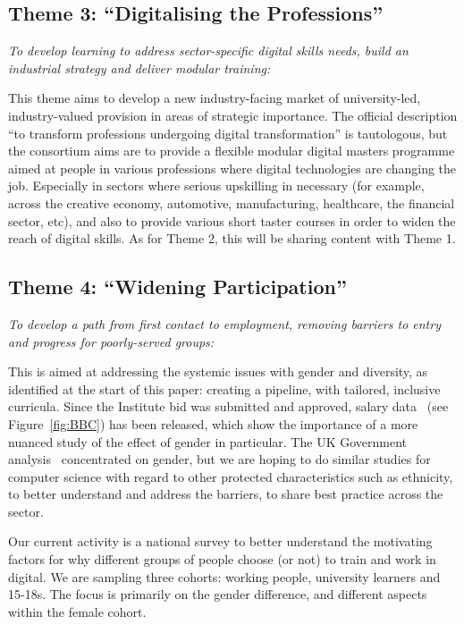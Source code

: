 \documentclass[conference]{IEEEtran}
\begin{document}
\subsection{Theme 3: ``Digitalising the Professions''}

{\emph{To develop learning to address sector-specific digital skills
needs, build an industrial strategy and deliver modular
training:}}\newline

\noindent This theme aims to develop a new industry-facing market of
university-led, industry-valued provision in areas of strategic
importance. The official description ``to transform professions
undergoing digital transformation'' \cite{DfE2018a} is tautologous,
but the consortium aims are to provide a flexible modular digital
masters programme aimed at people in various professions where digital
technologies are changing the job. Especially in sectors where serious
upskilling in necessary (for example, across the creative economy,
automotive, manufacturing, healthcare, the financial sector, etc), and
also to provide various short taster courses in order to widen the
reach of digital skills. As for Theme 2, this will be sharing content
with Theme 1.

\subsection{Theme 4: ``Widening Participation''}

{\emph{To develop a path from first contact to employment, removing
barriers to entry and progress for poorly-served groups:}}\newline

\noindent This is aimed at addressing the systemic issues with
gender and diversity, as identified at the start of this paper:
creating a pipeline, with tailored, inclusive curricula. Since
the Institute bid was submitted and approved, salary
data~\cite{DfE2018d} (see Figure~\ref{fig:BBC}) has been released,
which show the importance of a more nuanced study of the effect of
gender in particular. The UK Government analysis~\cite{DfE2018d}
concentrated on gender, but we are hoping to do similar studies for
computer science with regard to other protected characteristics such
as ethnicity, to better understand and address the barriers, to share
best practice across the sector.

Our current activity is a national survey to better understand the
motivating factors for why different groups of people choose (or not)
to train and work in digital. We are sampling three cohorts: working
people, university learners and 15-18s. The focus is primarily on the
gender difference, and different aspects within the female cohort.
\end{document}
